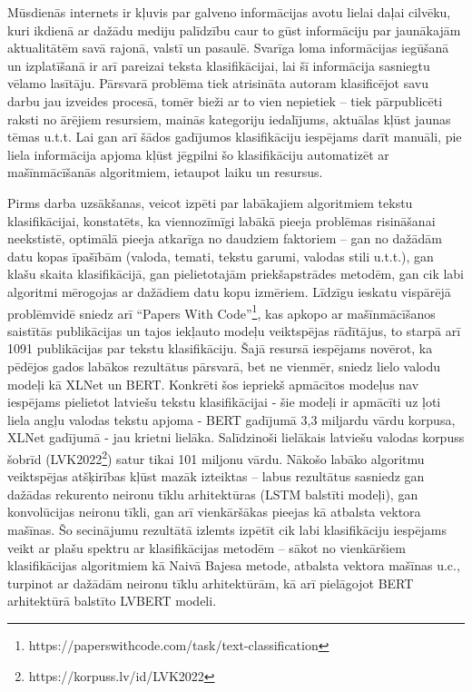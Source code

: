 Mūsdienās internets ir kļuvis par galveno informācijas avotu lielai daļai cilvēku, kuri ikdienā ar dažādu mediju palīdzību caur to gūst informāciju par jaunākajām aktualitātēm savā rajonā, valstī un pasaulē. Svarīga loma informācijas iegūšanā un izplatīšanā ir arī pareizai teksta klasifikācijai, lai šī informācija sasniegtu vēlamo lasītāju. Pārsvarā problēma tiek atrisināta autoram klasificējot savu darbu jau izveides procesā, tomēr bieži ar to vien nepietiek – tiek pārpublicēti raksti no ārējiem resursiem, mainās kategoriju iedalījums, aktuālas kļūst jaunas tēmas u.t.t. Lai gan arī šādos gadījumos klasifikāciju iespējams darīt manuāli, pie liela informācija apjoma kļūst jēgpilni šo klasifikāciju automatizēt ar mašīnmācīšanās algoritmiem, ietaupot laiku un resursus. 

Pirms darba uzsākšanas, veicot izpēti par labākajiem algoritmiem tekstu klasifikācijai, konstatēts, ka viennozīmīgi labākā pieeja problēmas risināšanai neekstistē, optimālā pieeja atkarīga no daudziem faktoriem – gan no dažādām datu kopas īpašībām (valoda, temati, tekstu garumi, valodas stili u.t.t.), gan klašu skaita klasifikācijā, gan pielietotajām priekšapstrādes metodēm, gan cik labi algoritmi mērogojas ar dažādiem datu kopu izmēriem. Līdzīgu ieskatu vispārējā problēmvidē sniedz arī “Papers With Code”\footnote{https://paperswithcode.com/task/text-classification}, kas apkopo ar mašīnmācīšanos saistītās publikācijas un tajos iekļauto modeļu veiktspējas rādītājus, to starpā arī 1091 publikācijas par tekstu klasifikāciju. Šajā resursā iespējams novērot, ka pēdējos gados labākos rezultātus pārsvarā, bet ne vienmēr, sniedz lielo valodu modeļi kā XLNet un BERT. Konkrēti šos iepriekš apmācītos modeļus nav iespējams pielietot latviešu tekstu klasifikācijai - šie modeļi ir apmācīti uz ļoti liela angļu valodas tekstu apjoma - BERT gadījumā 3,3 miljardu vārdu korpusa, XLNet gadījumā - jau krietni lielāka. Salīdzinoši lielākais latviešu valodas korpuss šobrīd (LVK2022\footnote{https://korpuss.lv/id/LVK2022}) satur tikai 101 miljonu vārdu. Nākošo labāko algoritmu veiktspējas atšķirības kļūst mazāk izteiktas – labus rezultātus sasniedz gan dažādas rekurento neironu tīklu arhitektūras (LSTM balstīti modeļi), gan konvolūcijas neironu tīkli, gan arī vienkāršākas pieejas kā atbalsta vektora mašīnas. Šo secinājumu rezultātā izlemts izpētīt cik labi klasifikāciju iespējams veikt ar plašu spektru ar klasifikācijas metodēm – sākot no vienkāršiem klasifikācijas algoritmiem kā Naivā Bajesa metode, atbalsta vektora mašīnas u.c., turpinot ar dažādām neironu tīklu arhitektūrām, kā arī pielāgojot BERT arhitektūrā balstīto LVBERT modeli. 

